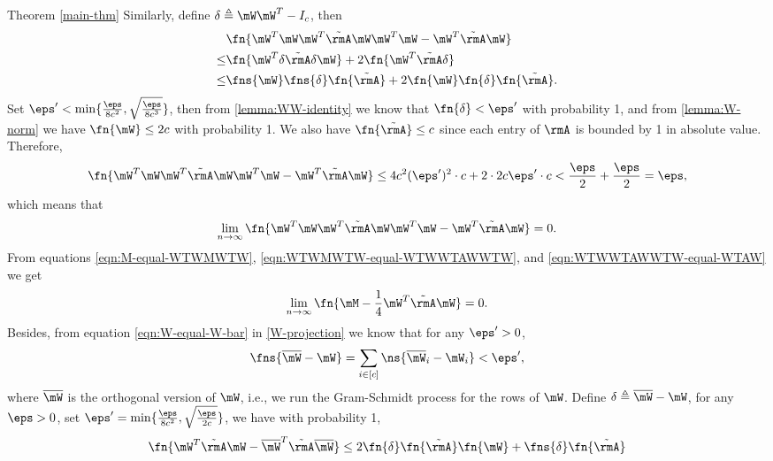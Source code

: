 \begin{proofof}{Theorem \cref{main-thm}}
Similarly, define $\delta\triangleq \mW\mW^T-I_c$, then
\begin{equation}\begin{split}
    &\fn{\mW^T\mW\mW^T\tilde{\rmA}\mW\mW^T\mW - \mW^T\tilde{\rmA}\mW}\\
\leq&\fn{\mW^T\delta\tilde{\rmA}\delta \mW}+2\fn{\mW^T\tilde{\rmA}\delta}\\
\leq&\fns{\mW}\fns{\delta}\fn{\tilde{\rmA}} + 2\fn{\mW}\fn{\delta}\fn{\tilde{\rmA}}.
\end{split}\end{equation}
Set $\eps'<\min\{\frac{\eps}{8c^2},\sqrt{\frac{\eps}{8c^3}}\}$, then from \cref{lemma:WW-identity} we know that $\fn{\delta}<\eps'$ with probability 1, and from \cref{lemma:W-norm} we have $\fn{\mW}\leq 2c$ with probability 1. We also have $\fn{\tilde{\rmA}}\leq c$ since each entry of $\rmA$ is bounded by 1 in absolute value.
Therefore,
\begin{equation}
\fn{\mW^T\mW\mW^T\tilde{\rmA}\mW\mW^T\mW - \mW^T\tilde{\rmA}\mW} \leq 4c^2(\eps')^2\cdot c + 2\cdot 2c\eps'\cdot c < \frac{\eps}{2} + \frac{\eps}{2} = \eps,
\end{equation}
which means that
\begin{equation}
\label{eqn:WTWWTAWWTW-equal-WTAW}
    \lim_{n\to\infty}\fn{\mW^T\mW\mW^T\tilde{\rmA}\mW\mW^T\mW - \mW^T\tilde{\rmA}\mW} = 0.
\end{equation}
From equations \cref{eqn:M-equal-WTWMWTW}, \cref{eqn:WTWMWTW-equal-WTWWTAWWTW}, and \cref{eqn:WTWWTAWWTW-equal-WTAW} we get
\begin{equation}
    \lim_{n\to\infty}\fn{\mM - \frac14\mW^T\tilde{\rmA}\mW} = 0.
\end{equation}
Besides, from equation \cref{eqn:W-equal-W-bar} in \cref{W-projection} we know that for any $\eps'>0$,
\begin{equation}
    \fns{\overline{\mW}-\mW} = \sum_{i\in[c]} \ns{\overline{\mW}_i-\mW_i}<\eps',
\end{equation}
where $\overline{\mW}$ is the orthogonal version of $\mW$, i.e., we run the Gram-Schmidt process for the rows of $\mW$. Define $\delta\triangleq \overline{\mW}-\mW$, for any $\eps>0$, set $\eps'=\min\{\frac{\eps}{8c^2},\sqrt{\frac{\eps}{2c}}\}$, we have with probability 1,
\begin{equation}\begin{split}
    \fn{\mW^T\tilde{\rmA}\mW - \overline{\mW}^T\tilde{\rmA}\overline{\mW}} &\leq 2\fn{\delta}\fn{\tilde{\rmA}}\fn{\mW} + \fns{\delta}\fn{\tilde{\rmA}}\\

\end{split}
\end{equation}
\end{proofof}
